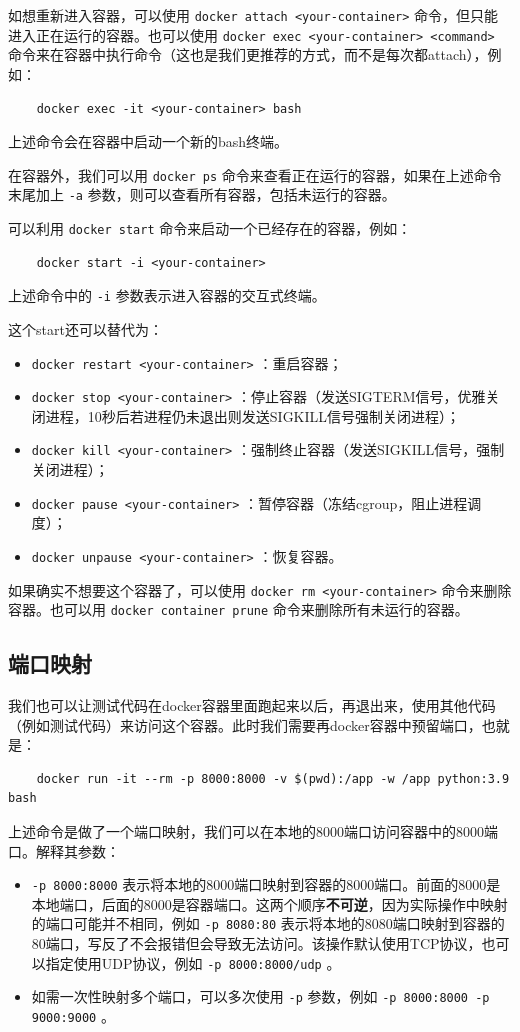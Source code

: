 如想重新进入容器，可以使用 \texttt{docker attach <your-container>} 命令，但只能进入正在运行的容器。也可以使用 \texttt{docker exec <your-container> <command>} 命令来在容器中执行命令（这也是我们更推荐的方式，而不是每次都attach），例如：
\begin{verbatim}
    docker exec -it <your-container> bash
\end{verbatim}
上述命令会在容器中启动一个新的bash终端。

在容器外，我们可以用 \texttt{docker ps} 命令来查看正在运行的容器，如果在上述命令末尾加上 \texttt{-a} 参数，则可以查看所有容器，包括未运行的容器。

可以利用 \texttt{docker start} 命令来启动一个已经存在的容器，例如：
\begin{verbatim}
    docker start -i <your-container>
\end{verbatim}
上述命令中的 \texttt{-i} 参数表示进入容器的交互式终端。

这个start还可以替代为：
\begin{itemize}
    \item  \texttt{docker restart <your-container>} ：重启容器；
    \item  \texttt{docker stop <your-container>} ：停止容器（发送SIGTERM信号，优雅关闭进程，10秒后若进程仍未退出则发送SIGKILL信号强制关闭进程）；
    \item  \texttt{docker kill <your-container>} ：强制终止容器（发送SIGKILL信号，强制关闭进程）；
    \item  \texttt{docker pause <your-container>} ：暂停容器（冻结cgroup，阻止进程调度）；
    \item  \texttt{docker unpause <your-container>} ：恢复容器。
\end{itemize}

如果确实不想要这个容器了，可以使用 \texttt{docker rm <your-container>} 命令来删除容器。也可以用 \texttt{docker container prune} 命令来删除所有未运行的容器。

\subsection{端口映射}

我们也可以让测试代码在docker容器里面跑起来以后，再退出来，使用其他代码（例如测试代码）来访问这个容器。此时我们需要再docker容器中预留端口，也就是：
\begin{verbatim}
    docker run -it --rm -p 8000:8000 -v $(pwd):/app -w /app python:3.9 bash
\end{verbatim}
上述命令是做了一个端口映射，我们可以在本地的8000端口访问容器中的8000端口。解释其参数：
\begin{itemize}
    \item  \texttt{-p 8000:8000} 表示将本地的8000端口映射到容器的8000端口。前面的8000是本地端口，后面的8000是容器端口。这两个顺序\textbf{不可逆}，因为实际操作中映射的端口可能并不相同，例如 \texttt{-p 8080:80} 表示将本地的8080端口映射到容器的80端口，写反了不会报错但会导致无法访问。该操作默认使用TCP协议，也可以指定使用UDP协议，例如 \texttt{-p 8000:8000/udp} 。
    \item 如需一次性映射多个端口，可以多次使用 \texttt{-p} 参数，例如 \texttt{-p 8000:8000 -p 9000:9000} 。
\end{itemize}


